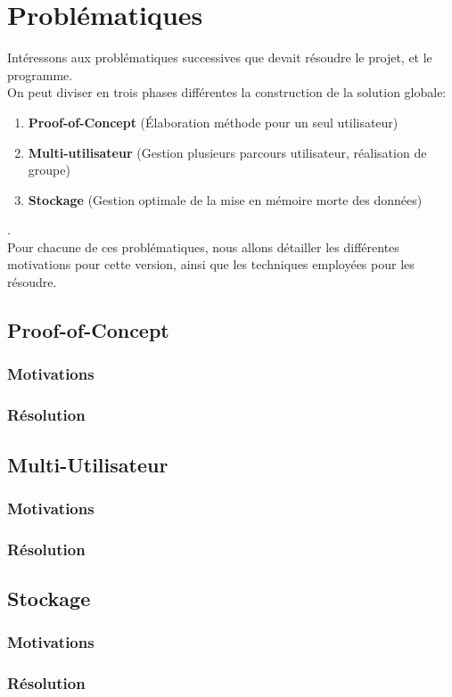 \chapter{Problématiques}
    Intéressons aux problématiques successives que devait résoudre le projet, et le programme.\\

    On peut diviser en trois phases différentes la construction de la solution globale:
    \begin{enumerate}
        \item \textbf{Proof-of-Concept} (Élaboration méthode pour un seul utilisateur)
        \item \textbf{Multi-utilisateur} (Gestion plusieurs parcours utilisateur, réalisation de groupe)
        \item \textbf{Stockage} (Gestion optimale de la mise en mémoire morte des données)
    \end{enumerate}.\\

    Pour chacune de ces problématiques, nous allons détailler les différentes motivations pour cette version, ainsi que les techniques employées pour les résoudre.

    \section{Proof-of-Concept}
        \subsection{Motivations}
        \subsection{Résolution}
    \section{Multi-Utilisateur}
        \subsection{Motivations}
        \subsection{Résolution}
    \section{Stockage}
        \subsection{Motivations}
        \subsection{Résolution}
